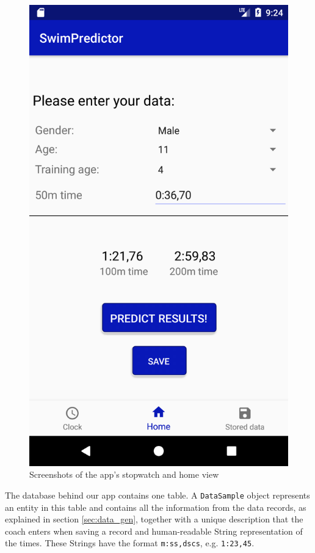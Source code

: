 \begin{figure}[ht]
\begin{minipage}{0.2\textwidth}
\includegraphics[width=\textwidth]{visualisation/prediction_view.png}
\end{minipage}
\caption{Screenshots of the app's stopwatch and home view}
\label{fig:app_screenshots}
\end{figure}
The database behind our app contains one table. A \texttt{DataSample} object represents an entity in this table and contains all the information from the data records, as explained in section \ref{sec:data_gen}, together with a unique description that the coach enters when saving a record and human-readable String representation of the times. These Strings have the format \texttt{m:ss,dscs}, e.g. \texttt{1:23,45}.\\

